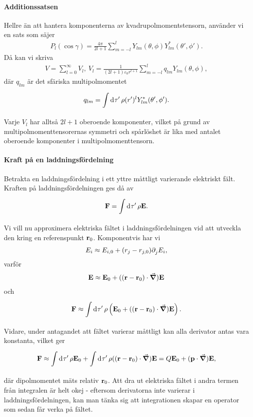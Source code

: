 \paragraph{Additionssatsen}
Hellre än att hantera komponenterna av kvadrupolmomentstensorn, använder vi en sats som säjer
\begin{align*}
	P_{l}(\cos{\gamma}) = \frac{4\pi}{2l + 1}\sum\limits_{m = -l}^{l}Y_{lm}(\theta, \phi)Y_{lm}^{*}(\theta', \phi').
\end{align*}
Då kan vi skriva
\begin{align*}
	V = \sum\limits_{l = 0}^{\infty}V_{l},\ V_{l} = \frac{1}{(2l + 1)\varepsilon_{0}r^{l + 1}}\sum\limits_{m = -l}^{l}q_{lm}Y_{lm}(\theta, \phi),
\end{align*}
där $q_{lm}$ är det sfäriska multipolmomentet
\begin{align*}
	q_{lm} = \int\limits_{}^{}\dd[]{\tau'}\rho (r')^{l}Y_{lm}^{*}(\theta', \phi').
\end{align*}
Varje $V_{l}$ har alltså $2l + 1$ oberoende komponenter, vilket på grund av multipolmomenttensorernas symmetri och spårlöshet är lika med antalet oberoende komponenter i multipolmomenttensorn.

\paragraph{Kraft på en laddningsfördelning}
Betrakta en laddningsfördelning i ett yttre måttligt varierande elektriskt fält. Kraften på laddningsfördelningen ges då av
\begin{align*}
	\vb{F} = \int\limits_{}^{}\dd[]{\tau'}\rho\vb{E}.
\end{align*}
Vi vill nu approximera elektriska fältet i laddningsfördelningen vid att utveckla den kring en referenspunkt $\vb{r}_{0}$. Komponentvis har vi
\begin{align*}
	E_{i} \approx E_{i, 0} + (r_{j} - r_{j, 0})\partial_{j}^{}E_{i},
\end{align*}
varför
\begin{align*}
	\vb{E} \approx \vb{E}_{0} + ((\vb{r} - \vb{r}_{0})\cdot\grad)\vb{E}
\end{align*}
och
\begin{align*}
	\vb{F} \approx \int\limits_{}^{}\dd[]{\tau'}\rho\left(\vb{E}_{0} + ((\vb{r} - \vb{r}_{0})\cdot\grad)\vb{E}\right).
\end{align*}
Vidare, under antagandet att fältet varierar måttligt kan alla derivator antas vara konstanta, vilket ger
\begin{align*}
	\vb{F} \approx \int\limits_{}^{}\dd[]{\tau'}\rho\vb{E}_{0} + \int\limits_{}^{}\dd[]{\tau'}\rho((\vb{r} - \vb{r}_{0})\cdot\grad)\vb{E} = Q\vb{E}_{0} + (\vb{p}\cdot\grad)\vb{E},
\end{align*}
där dipolmomentet mäts relativ $\vb{r}_{0}$. Att dra ut elektriska fältet i andra termen från integralen är helt okej - eftersom derivatorna inte varierar i laddningsfördelningen, kan man tänka sig att integrationen skapar en operator som sedan får verka på fältet.


